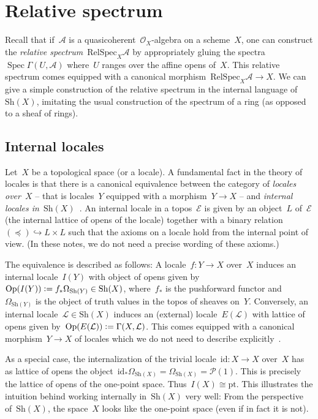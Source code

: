 \documentclass[10pt]{amsart}
\theoremstyle{definition}
\theoremstyle{plain}
\theoremstyle{remark}
\newcommand{\A}{\mathcal{A}}
\newcommand{\E}{\mathcal{E}}
\renewcommand{\O}{\mathcal{O}}
\renewcommand{\L}{\mathcal{L}}
\renewcommand{\P}{\mathcal{P}}
\newcommand{\id}{\mathrm{id}}
\newcommand{\Sh}{\mathrm{Sh}}
\newcommand{\pt}{\mathrm{pt}}
\DeclareMathOperator{\Spec}{Spec}
\newcommand{\RelSpec}[2]{\mathrm{RelSpec}_{#1}{#2}}
\newcommand{\Open}{\mathrm{Op}}
\newcommand{\?}{\,{:}\,}
\renewcommand{\_}{\mathpunct{.}\,}
\newcommand{\defeq}{\vcentcolon=}
\begin{document}


\section{Relative spectrum}
\label{sect:relative-spectrum}

Recall that if~$\A$ is a quasicoherent~$\O_X$-algebra on a scheme~$X$, one can
construct the \emph{relative spectrum}~$\RelSpec{X}{\A}$ by appropriately
gluing the spectra~$\Spec \Gamma(U,\A)$ where~$U$ ranges over the affine opens
of~$X$. This relative spectrum comes equipped with a canonical
morphism~$\RelSpec{X}{\A} \to X$. We can give a simple construction of the
relative spectrum in the internal language of~$\Sh(X)$, imitating the usual
construction of the spectrum of a ring (as opposed to a sheaf of rings).

\subsection{Internal locales} Let~$X$ be a topological space (or a locale). A
fundamental fact in the theory of locales is that there is a canonical
equivalence between the category of \emph{locales over~$X$} -- that is
locales~$Y$ equipped with a morphism~$Y \to X$ -- and \emph{internal locales
in~$\Sh(X)$}~\cite[page~49]{johnstone:point}. An internal locale in a topos~$\E$ is given by an object~$L$ of~$\E$
(the internal lattice of opens of the locale) together with a binary
relation~$(\preceq) \hookrightarrow L \times L$ such that the axioms on a
locale hold from the internal point of view. (In these notes, we do not need a
precise wording of these axioms.)

The equivalence is described as follows: A locale~$f : Y \to X$ over~$X$
induces an internal locale~$I(Y)$ with object of opens given by~$\Open(I(Y)) \defeq
f_* \Omega_{\Sh(Y)} \in \Sh(X)$, where~$f_*$ is the pushforward functor
and~$\Omega_{\Sh(Y)}$ is the object of truth values in the topos of sheaves
on~$Y$. Conversely, an internal locale~$\L \in \Sh(X)$ induces an (external)
locale~$E(\L)$ with lattice of opens given by~$\Open(E(\L)) \defeq \Gamma(X,\L)$.
This comes equipped with a canonical morphism~$Y \to X$ of locales which we do
not need to describe explicitly~\cite[section~C1.6]{johnstone:elephant}.

As a special case, the internalization of the trivial locale~$\id : X \to X$
over~$X$ has as lattice of opens the object~$\id_* \Omega_{\Sh(X)} =
\Omega_{\Sh(X)} = \P(1)$. This is precisely the lattice of opens of the
one-point space. Thus~$I(X) \cong \pt$. This illustrates the intuition
behind working internally in~$\Sh(X)$ very well: From the perspective
of~$\Sh(X)$, the space~$X$ looks like the one-point space (even if in fact it
is not).
\end{document}
